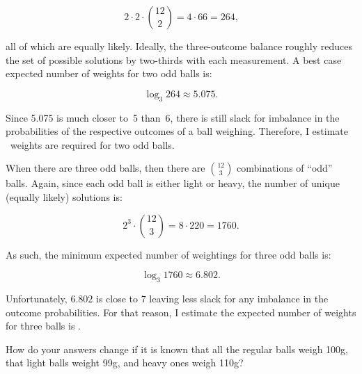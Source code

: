   \[ 2\cdot 2 \cdot \binom{12}{2} = 4 \cdot 66 = 264 \text{,} \]

  \noindent
  all of which are equally likely.  Ideally, the three-outcome balance roughly reduces the set of possible solutions by two-thirds with each measurement.  A best case expected number of weights for two odd balls is:

  \[ \log_{3} 264\approx 5.075 {.} \]

  Since 5.075 is much closer to~5 than~6, there is still slack for imbalance in the probabilities of the respective outcomes of a ball weighing.  Therefore, I estimate ~weights are required for two odd balls.

  When there are three odd balls, then there are $\binom{12}{3}$ combinations of ``odd'' balls.  Again, since each odd ball is either light or heavy, the number of unique (equally likely) solutions is:

  \[ 2^3 \cdot \binom{12}{3} = 8 \cdot 220 = 1760 \text{.} \]

  \noindent
  As such, the minimum expected number of weightings for three odd balls is:

  \[ \log_{3} 1760 \approx 6.802 \text{.} \]

  \noindent
  Unfortunately, $6.802$ is close to $7$ leaving less slack for any imbalance in the outcome probabilities.  For that reason, I estimate the expected number of weights for three balls is .

\begin{subproblem}
  How do your answers change if it is known that all the regular balls weigh 100g, that light balls weight 99g, and heavy ones weigh 110g?
\end{subproblem}


